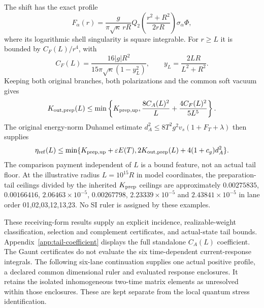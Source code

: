 The shift has the exact profile
\[
 F_\alpha(r)=\frac{g}{\pi\sqrt\kappa\,rR}
 Q_2\!\left(\frac{r^2+R^2}{2rR}\right)\sigma_\alpha\Phi,
\]
where its logarithmic shell singularity is square integrable. For $r\ge L$ it is bounded by $C_F(L)/r^4$, with
\[
 C_F(L)=\frac{16|g|R^2}{15\pi\sqrt\kappa(1-y_L^2)},\qquad
 y_L=\frac{2LR}{L^2+R^2}.
\]
Keeping both original branches, both polarizations and the common soft vacuum gives
\[
 K_{{\rm out},{\rm prep}}(L)\le
 \min\left\{K_{{\rm prep},\rm up},\frac{8C_A(L)^2}{L}
                              +\frac{4C_F(L)^2}{5L^5}\right\}.
\]
The original energy-norm Duhamel estimate $d_A^2\le8T^2g^2v_s(1+F_T+\lambda)$ then supplies
\[
 \eta_{\rm ref}(L)\le\min\{K_{{\rm prep},\rm up}+\varepsilon E(T),
               2K_{{\rm out},{\rm prep}}(L)+4(1+c_g)d_A^2\}.
\]
The comparison payment independent of $L$ is a bound feature, not an actual tail floor. At the illustrative radius $L=10^{15}R$ in model coordinates, the preparation-tail ceilings divided by the inherited $K_{\rm prep}$ ceilings are approximately $0.00275835$, $0.00166416$, $2.06463\times10^{-5}$, $0.00267798$, $2.23339\times10^{-5}$ and $2.43841\times10^{-5}$ in lane order 01,02,03,12,13,23. No SI ruler is assigned by these examples.

These receiving-form results supply an explicit incidence, realizable-weight classification, selection and complement certificates, and actual-state tail bounds. Appendix~\ref{app:tail-coefficient} displays the full standalone $C_A(L)$ coefficient. The Gaunt certificates do not evaluate the six time-dependent current-response integrals. The following six-lane continuation supplies one actual positive profile, a declared common dimensional ruler and evaluated response enclosures. It retains the isolated inhomogeneous two-time matrix elements as unresolved within those enclosures. These are kept separate from the local quantum stress identification.
